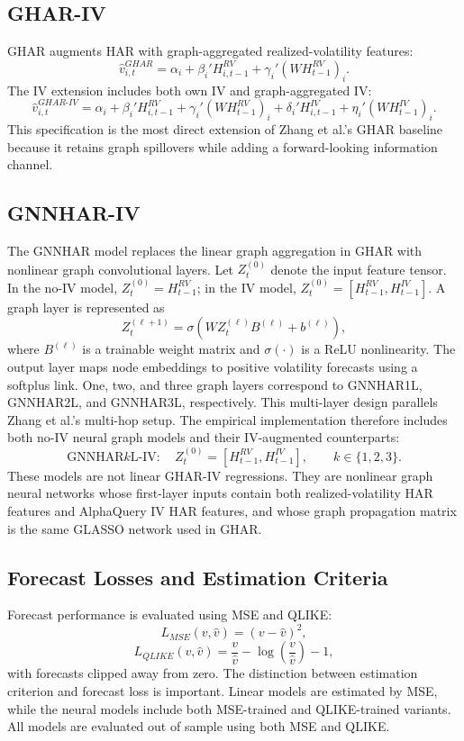 \documentclass[11pt,a4paper]{article}
\begin{document}
\subsection{GHAR-IV}

GHAR augments HAR with graph-aggregated realized-volatility features:
\[
\widehat v_{i,t}^{GHAR}
= \alpha_i + \beta_i' H^{RV}_{i,t-1}
+ \gamma_i' \left(WH^{RV}_{t-1}\right)_i .
\]
The IV extension includes both own IV and graph-aggregated IV:
\[
\widehat v_{i,t}^{GHAR\text{-}IV}
= \alpha_i + \beta_i' H^{RV}_{i,t-1}
+ \gamma_i' \left(WH^{RV}_{t-1}\right)_i
+ \delta_i' H^{IV}_{i,t-1}
+ \eta_i' \left(WH^{IV}_{t-1}\right)_i .
\]
This specification is the most direct extension of Zhang et al.'s GHAR baseline because it
retains graph spillovers while adding a forward-looking information channel.

\subsection{GNNHAR-IV}

The GNNHAR model replaces the linear graph aggregation in GHAR with nonlinear graph
convolutional layers. Let \(Z_t^{(0)}\) denote the input feature tensor. In the no-IV model,
\(Z_t^{(0)}=H^{RV}_{t-1}\); in the IV model, \(Z_t^{(0)}=[H^{RV}_{t-1},H^{IV}_{t-1}]\). A graph
layer is represented as
\[
Z_t^{(\ell+1)}
= \sigma\left(W Z_t^{(\ell)} B^{(\ell)} + b^{(\ell)}\right),
\]
where \(B^{(\ell)}\) is a trainable weight matrix and \(\sigma(\cdot)\) is a ReLU nonlinearity.
The output layer maps node embeddings to positive volatility forecasts using a softplus link.
One, two, and three graph layers correspond to GNNHAR1L, GNNHAR2L, and GNNHAR3L,
respectively. This multi-layer design parallels Zhang et al.'s multi-hop setup. The empirical
implementation therefore includes both no-IV neural graph models and their IV-augmented
counterparts:
\[
\text{GNNHAR}k\text{L-IV}: \quad Z_t^{(0)}=[H^{RV}_{t-1},H^{IV}_{t-1}], \qquad k\in\{1,2,3\}.
\]
These models are not linear GHAR-IV regressions. They are nonlinear graph neural networks
whose first-layer inputs contain both realized-volatility HAR features and AlphaQuery IV HAR
features, and whose graph propagation matrix is the same GLASSO network used in GHAR.

\subsection{Forecast Losses and Estimation Criteria}

Forecast performance is evaluated using MSE and QLIKE:
\[
L_{MSE}(v,\widehat v) = (v-\widehat v)^2,
\]
\[
L_{QLIKE}(v,\widehat v)
= \frac{v}{\widehat v} - \log\left(\frac{v}{\widehat v}\right) - 1,
\]
with forecasts clipped away from zero. The distinction between estimation criterion and
forecast loss is important. Linear models are estimated by MSE, while the neural models include
both MSE-trained and QLIKE-trained variants. All models are evaluated out of sample using both
MSE and QLIKE.
\end{document}
